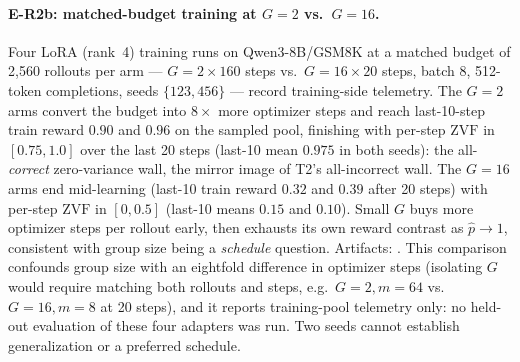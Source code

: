 \documentclass[11pt]{article}
\theoremstyle{plain}
\theoremstyle{definition}
\theoremstyle{remark}
\newcommand{\ZVF}{\ensuremath{\mathrm{ZVF}}}
\newcommand{\1}{\mathbb{1}}
\begin{document}
\paragraph{E-R2b: matched-budget training at $G{=}2$ vs.\ $G{=}16$.} Four
LoRA (rank~4) training runs on Qwen3-8B/GSM8K at a matched budget of
2{,}560 rollouts per arm --- $G{=}2\times160$ steps vs.\ $G{=}16\times20$
steps, batch 8, 512-token completions, seeds $\{123,456\}$ --- record
training-side telemetry. The $G{=}2$ arms convert the budget into
$8\times$ more optimizer steps and reach last-10-step train reward $0.90$ and
$0.96$ on the sampled pool, finishing with per-step $\ZVF$ in $[0.75,1.0]$
over the last 20 steps (last-10 mean $0.975$ in both seeds): the
all-\emph{correct} zero-variance wall, the mirror image of T2's all-incorrect
wall. The $G{=}16$ arms end mid-learning (last-10 train reward $0.32$ and
$0.39$ after 20 steps) with per-step $\ZVF$ in $[0,0.5]$ (last-10 means $0.15$
and $0.10$). Small $G$ buys more optimizer steps per rollout early, then
exhausts its own reward contrast as $\hat p\to 1$, consistent with group size
being a \emph{schedule} question. Artifacts:
.
This comparison confounds group size with an eightfold difference in optimizer
steps (isolating $G$ would require matching both rollouts and steps, e.g.\
$G{=}2,m{=}64$ vs.\ $G{=}16,m{=}8$ at 20 steps), and it reports training-pool
telemetry only: no held-out evaluation of these four adapters was run. Two
seeds cannot establish generalization or a preferred schedule.
\end{document}
